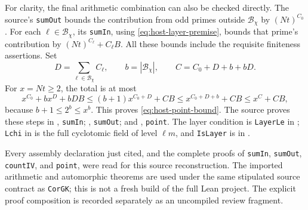 For clarity, the final arithmetic combination can also be checked
directly.  The source's \texttt{sumOut} bounds the contribution from
odd primes outside \(\mathcal B_\chi\) by \((Nt)^{C_0}\).
For each \(\ell\in\mathcal B_\chi\), its \texttt{sumIn}, using
\eqref{eq:host-layer-premise}, bounds that prime's contribution by
\((Nt)^{C_\ell}+C_\ell B\).  All these bounds include the requisite
finiteness assertions.  Set
\[
 D=\sum_{\ell\in\mathcal B_\chi}C_\ell,
 \qquad b=|\mathcal B_\chi|,
 \qquad C=C_0+D+b+bD.
\]
For \(x=Nt\ge2\), the total is at most
\[
 x^{C_0}+b x^D+bDB
 \le (b+1)x^{C_0+D}+CB
 \le x^{C_0+D+b}+CB
 \le x^C+CB,
\]
because \(b+1\le2^b\le x^b\).  This proves
\eqref{eq:host-point-bound}.  The source proves these steps in
, \texttt{sumIn};
, \texttt{sumOut}; and
, \texttt{point}.
The layer condition is \texttt{LayerLe} in
;
\texttt{Lchi} in 
is the full cyclotomic field of level \(\ell m\), and
\texttt{IsLayer} is in .

Every assembly declaration just cited, and the complete proofs of
\texttt{sumIn}, \texttt{sumOut}, \texttt{countIV}, and \texttt{point},
were read for this source reconstruction.  The imported arithmetic
and automorphic theorems are used under the same stipulated source
contract as \texttt{CorGK}; this is not a fresh build of the full
Lean project.  The explicit proof composition is recorded separately
as an uncompiled review fragment.
